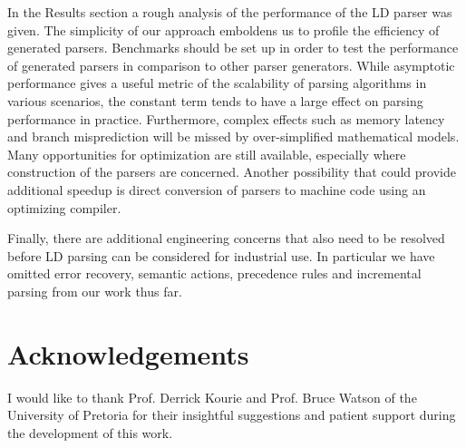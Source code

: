 \documentclass[a4paper,11pt]{article}
\begin{document}
In the Results section a rough analysis of the performance of the LD parser was given.
The simplicity of our approach emboldens us to profile the efficiency of generated parsers.
Benchmarks should be set up in order to test the performance of generated parsers in comparison to other parser generators.
While asymptotic performance gives a useful metric of the scalability of parsing algorithms in various scenarios, the constant term tends to have a large effect on parsing performance in practice.
Furthermore, complex effects such as memory latency and branch misprediction will be missed by over-simplified mathematical models.
Many opportunities for optimization are still available, especially where construction of the parsers are concerned.
Another possibility that could provide additional speedup is direct conversion of parsers to machine code using an optimizing compiler.

Finally, there are additional engineering concerns that also need to be resolved before LD parsing can be considered for industrial use.
In particular we have omitted error recovery, semantic actions, precedence rules and incremental parsing from our work thus far.


\section*{Acknowledgements}
I would like to thank Prof. Derrick Kourie and Prof. Bruce Watson of the University of Pretoria for their insightful suggestions and patient support during the development of this work.



\end{document}
